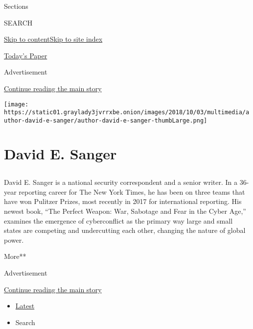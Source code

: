 Sections

SEARCH

\protect\hyperlink{site-content}{Skip to
content}\protect\hyperlink{site-index}{Skip to site index}

\href{https://myaccount.nytimes3xbfgragh.onion/auth/login?response_type=cookie\&client_id=vi}{}

\href{https://www.nytimes3xbfgragh.onion/section/todayspaper}{Today's
Paper}

Advertisement

\protect\hyperlink{after-top}{Continue reading the main story}

\texttt{[image: https://static01.graylady3jvrrxbe.onion/images/2018/10/03/multimedia/author-david-e-sanger/author-david-e-sanger-thumbLarge.png]}

\hypertarget{david-e-sanger}{%
\section{David E. Sanger}\label{david-e-sanger}}

\subsection{}

David E. Sanger is a national security correspondent and a senior
writer. In a 36-year reporting career for The New York Times, he has
been on three teams that have won Pulitzer Prizes, most recently in 2017
for international reporting. His newest book, ``The Perfect Weapon: War,
Sabotage and Fear in the Cyber Age,'' examines the emergence of
cyberconflict as the primary way large and small states are competing
and undercutting each other, changing the nature of global power.

More**

Advertisement

\protect\hyperlink{after-mid1}{Continue reading the main story}

\begin{itemize}
\tightlist
\item
  \protect\hyperlink{stream-panel}{Latest}
\item
  Search
\end{itemize}

